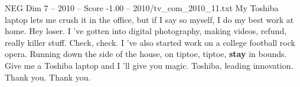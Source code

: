 \begin{textsample}{NEG Dim 7 – 2010 – Score -1.00 – 2010/tv\_com\_2010\_11.txt}  \label{ex:f7_neg_024}
My Toshiba laptop lets me crush it in the office, but if I say so myself, I do my best work at home.
Hey loser.
I 've gotten into digital photography, making videos, refund, really killer stuff.
Check, check.
I 've also started work on a college football rock opera.
Running down the side of the house, on tiptoe, tiptoe, \textbf{stay} in bounds.
Give me a Toshiba laptop and I 'll give you magic.
Toshiba, leading innovation.
Thank you.
Thank you.

\end{textsample}
